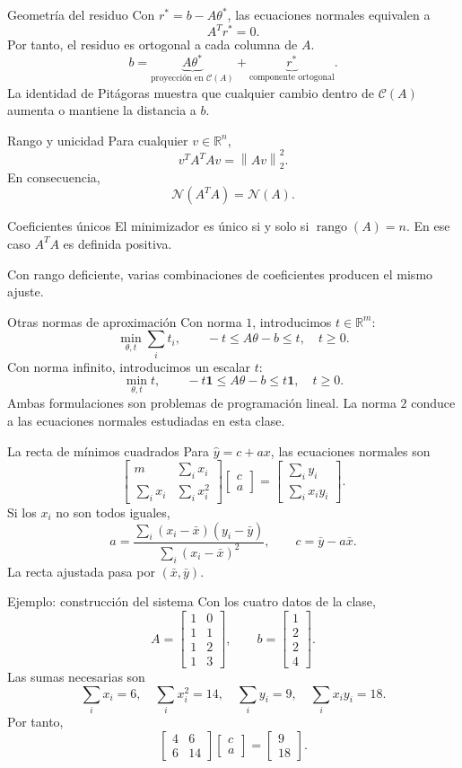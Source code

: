 \documentclass[aspectratio=169,12pt]{beamer}
\newcommand{\R}{\mathbb{R}}
\newcommand{\mat}[1]{\begin{bmatrix}#1\end{bmatrix}}
\newcommand{\norm}[1]{\left\lVert#1\right\rVert}
\begin{document}
\begin{frame}{Geometría del residuo}
Con $r^*=b-A\theta^*$, las ecuaciones normales equivalen a
\[
A^Tr^*=0.
\]
Por tanto, el residuo es ortogonal a cada columna de $A$.
\[
b=\underbrace{A\theta^*}_{\text{proyección en }\mathcal C(A)}
+\underbrace{r^*}_{\text{componente ortogonal}}.
\]
La identidad de Pitágoras muestra que cualquier cambio dentro de $\mathcal C(A)$
aumenta o mantiene la distancia a $b$.
\end{frame}

\begin{frame}{Rango y unicidad}
Para cualquier $v\in\R^n$,
\[
v^TA^TAv=\norm{Av}_2^2.
\]
En consecuencia,
\[
\mathcal N(A^TA)=\mathcal N(A).
\]
\begin{block}{Coeficientes únicos}
El minimizador es único si y solo si $\operatorname{rango}(A)=n$.
En ese caso $A^TA$ es definida positiva.
\end{block}
Con rango deficiente, varias combinaciones de coeficientes producen el mismo ajuste.
\end{frame}

\begin{frame}{Otras normas de aproximación}
Con norma $1$, introducimos $t\in\R^m$:
\[
\min_{\theta,t}\sum_i t_i,\qquad
-t\leq A\theta-b\leq t,\quad t\geq0.
\]
Con norma infinito, introducimos un escalar $t$:
\[
\min_{\theta,t}t,\qquad
-t\mathbf1\leq A\theta-b\leq t\mathbf1,\quad t\geq0.
\]
Ambas formulaciones son problemas de programación lineal.
La norma $2$ conduce a las ecuaciones normales estudiadas en esta clase.
\end{frame}

\begin{frame}{La recta de mínimos cuadrados}
Para $\widehat y=c+ax$, las ecuaciones normales son
\[
\mat{m&\sum_i x_i\\\sum_i x_i&\sum_i x_i^2}
\mat{c\\a}=\mat{\sum_i y_i\\\sum_i x_iy_i}.
\]
Si los $x_i$ no son todos iguales,
\[
a=\frac{\sum_i(x_i-\bar x)(y_i-\bar y)}{\sum_i(x_i-\bar x)^2},
\qquad c=\bar y-a\bar x.
\]
La recta ajustada pasa por $(\bar x,\bar y)$.
\end{frame}

\begin{frame}{Ejemplo: construcción del sistema}
Con los cuatro datos de la clase,
\[
A=\mat{1&0\\1&1\\1&2\\1&3},\qquad b=\mat{1\\2\\2\\4}.
\]
Las sumas necesarias son
\[
\sum_i x_i=6,\quad\sum_i x_i^2=14,\quad
\sum_i y_i=9,\quad\sum_i x_iy_i=18.
\]
Por tanto,
\[
\mat{4&6\\6&14}\mat{c\\a}=\mat{9\\18}.
\]
\end{frame}
\end{document}
